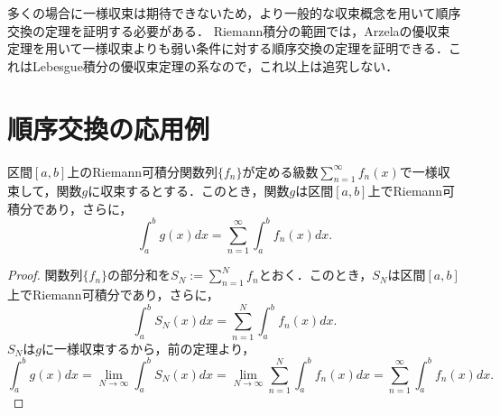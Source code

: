 
\begin{remark}
多くの場合に一様収束は期待できないため，より一般的な収束概念を用いて順序交換の定理を証明する必要がある．
Riemann積分の範囲では，Arzelaの優収束定理を用いて一様収束よりも弱い条件に対する順序交換の定理を証明できる．これはLebesgue積分の優収束定理の系なので，これ以上は追究しない．
\end{remark}

\section{順序交換の応用例}

\begin{theorem}[関数項級数の項別積分]
区間$[a,b]$上のRiemann可積分関数列$\{f_n\}$が定める級数$\sum_{n=1}^\infty f_n(x)$で一様収束して，関数$g$に収束するとする．このとき，関数$g$は区間$[a,b]$上でRiemann可積分であり，さらに，
    \[
    \int_a^b g(x) dx = \sum_{n=1}^\infty \int_a^b f_n(x) dx.
    \]
\end{theorem}
\begin{proof}
    関数列$\{f_n\}$の部分和を$S_N := \sum_{n=1}^N f_n$とおく．このとき，$S_N$は区間$[a,b]$上でRiemann可積分であり，さらに，
    \[
    \int_a^b S_N(x) dx = \sum_{n=1}^N \int_a^b f_n(x) dx.
    \]
    $S_N$は$g$に一様収束するから，前の定理より，
    \[
    \int_a^b g(x) dx = \lim_{N \to \infty} \int_a^b S_N(x) dx = \lim_{N \to \infty} \sum_{n=1}^N \int_a^b f_n(x) dx = \sum_{n=1}^\infty \int_a^b f_n(x) dx.
    \]
\end{proof}

